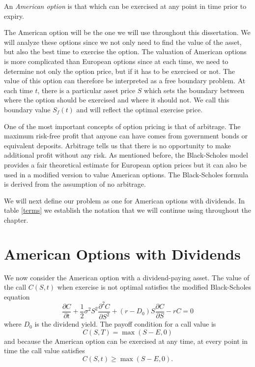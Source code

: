 \documentclass[00main.tex]{subfiles}
\begin{document}


\begin{defi}
An \emph{American option} is that which can be exercised at any point in time prior to expiry.
\end{defi}

The American option will be the one we will use throughout this dissertation. We will analyze these options since we not only need to find the value of the asset, but also the best time to exercise the option. The valuation of American options is more complicated than European options since at each time, we need to determine not only the option price, but if it has to be exercised or not. The value of this option can therefore be interpreted as a free boundary problem. At each time $t$, there is a particular asset price $S$ which sets the boundary between where the option should be exercised and where it should not. We call this boundary value $S_f (t)$ and will reflect the optimal exercise price. 




One of the most important concepts of option pricing is that of arbitrage. The maximum risk-free profit that anyone can have comes from government bonds or equivalent deposits. Arbitrage tells us that there is no opportunity to make additional profit without any risk. As mentioned before, the Black-Scholes model provides a fair theoretical estimate for European option prices but it can also be used in a modified version to value American options. The Black-Scholes formula is derived from the assumption of no arbitrage. 

We will next define our problem as one for American options with dividends. In table \ref{terms} we establish the notation that we will continue using throughout the chapter.





\section{American Options with Dividends}






We now consider the American option with a dividend-paying asset. The value of the call $C(S,t)$ when exercise is not optimal satisfies the modified Black-Scholes equation \begin{equation}
\frac{\partial C}{\partial t} + \frac{1}{2} \sigma^2 S^2 \frac{\partial^2 C}{\partial S^2} + (r-D_0) S \frac{\partial C}{\partial S} - rC = 0 \label{BS_dividend}
\end{equation} where $D_0$ is the dividend yield. The payoff condition for a call value is \[ C(S,T) = \max (S-E,0) \] and because the American option can be exercised at any time, at every point in time the call value satisfies \[ C(S,t) \geq \max (S-E,0). \]
\end{document}
